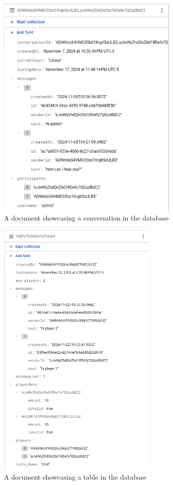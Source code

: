 \begin{figure}[!htb]
    \centering
    \includegraphics[width=0.8\textwidth]{figures/DB Screenshot conversations.png}
    \caption{A document showcasing a conversation in the database}
    \label{fig:conversationDB}
\end{figure}

\begin{figure}[!htb]
    \centering
    \includegraphics[width=0.7\textwidth]{figures/DB Screenshot table.png}
    \caption{A document showcasing a table in the database}
    \label{fig:tableDB}
\end{figure}


